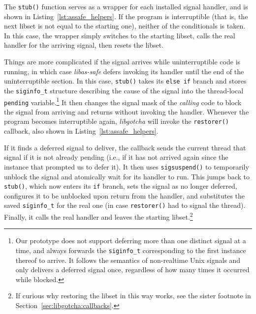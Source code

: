 The \texttt{stub()} function serves as a wrapper for each installed signal handler,
and is shown in Listing~\ref{lst:assafe_helpers}.  If the program is interruptible
(that is, the next libset is not equal to the starting one), neither of the
conditionals is taken.  In this case, the wrapper simply switches to the starting
libset, calls the real handler for the arriving signal, then resets the libset.

Things are more complicated if the signal arrives while uninterruptible code is
running, in which case \textit{libas-safe} defers invoking its handler until the end
of the uninterruptible section.  In this case, \texttt{stub()} takes its
\texttt{else if} branch and stores the \texttt{siginfo\_t} structure describing the
cause of the signal into the thread-local \texttt{pending} variable.\footnote{Our
prototype does not support deferring more than one distinct signal at a time, and
always forwards the \texttt{siginfo\_t} corresponding to the first instance thereof
to arrive.  It follows the semantics of non-realtime Unix signals and only delivers
a deferred signal once, regardless of how many times it occurred while blocked.}  It
then changes the signal mask of the \textit{calling} code to block the signal from
arriving and returns without invoking the handler.  Whenever the program becomes
interruptible again, \textit{libgotcha} will invoke the \texttt{restorer()} callback,
also shown in Listing~\ref{lst:assafe_helpers}.

If it finds a deferred signal to deliver, the callback sends the current thread that
signal if it is not already pending (i.e., if it has not arrived again since the
instance that prompted us to defer it).  It then uses \texttt{sigsuspend()} to
temporarily unblock the signal and atomically wait for its handler to run.  This
jumps back to \texttt{stub()}, which now enters its \texttt{if} branch, sets the
signal as no longer deferred, configures it to be unblocked upon return from the
handler, and substitutes the saved \texttt{siginfo\_t} for the real one (in case
\texttt{restorer()} had to signal the thread).  Finally, it calls the real
handler and leaves the starting libset.\footnote{If curious why restoring the libset
in this way works, see the sister footnote in Section~\ref{sec:libgotcha:callbacks}.}

